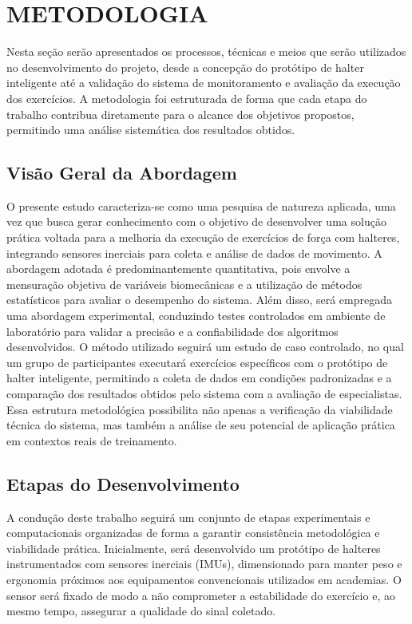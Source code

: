 \chapter{METODOLOGIA}
\label{cap:metodologia}

Nesta seção serão apresentados os processos, técnicas e meios que serão utilizados no desenvolvimento do projeto, desde a concepção do protótipo de halter inteligente até a validação do sistema de monitoramento e avaliação da execução dos exercícios. A metodologia foi estruturada de forma que cada etapa do trabalho contribua diretamente para o alcance dos objetivos propostos, permitindo uma análise sistemática dos resultados obtidos.


\section{Visão Geral da Abordagem}

O presente estudo caracteriza-se como uma pesquisa de natureza aplicada, uma vez que busca gerar conhecimento com o objetivo de desenvolver uma solução prática voltada para a melhoria da execução de exercícios de força com halteres, integrando sensores inerciais para coleta e análise de dados de movimento. A abordagem adotada é predominantemente quantitativa, pois envolve a mensuração objetiva de variáveis biomecânicas e a utilização de métodos estatísticos para avaliar o desempenho do sistema. Além disso, será empregada uma abordagem experimental, conduzindo testes controlados em ambiente de laboratório para validar a precisão e a confiabilidade dos algoritmos desenvolvidos. O método utilizado seguirá um estudo de caso controlado, no qual um grupo de participantes executará exercícios específicos com o protótipo de halter inteligente, permitindo a coleta de dados em condições padronizadas e a comparação dos resultados obtidos pelo sistema com a avaliação de especialistas. Essa estrutura metodológica possibilita não apenas a verificação da viabilidade técnica do sistema, mas também a análise de seu potencial de aplicação prática em contextos reais de treinamento.

\section{Etapas do Desenvolvimento}

A condução deste trabalho seguirá um conjunto de etapas experimentais e computacionais organizadas de forma a garantir consistência metodológica e viabilidade prática. Inicialmente, será desenvolvido um protótipo de halteres instrumentados com sensores inerciais (IMUs), dimensionado para manter peso e ergonomia próximos aos equipamentos convencionais utilizados em academias. O sensor será fixado de modo a não comprometer a estabilidade do exercício e, ao mesmo tempo, assegurar a qualidade do sinal coletado.  

